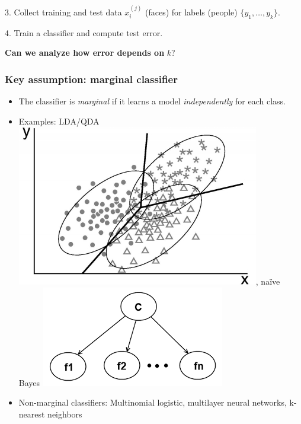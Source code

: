 \documentclass{beamer}
\begin{document}
\begin{frame}
\pause

\vspace{0.1in}
3. Collect training and test data $x_i^{(j)}$ (faces) for labels (people) $\{y_1,\hdots, y_k\}$.\pause

\vspace{0.1in}
4. Train a classifier and compute test error. \pause

\vspace{0.1in}
\textbf{Can we analyze how error depends on }$k$?
\end{frame}


\begin{frame}
\frametitle{Key assumption: marginal classifier}
\begin{itemize}
\item The classifier is \emph{marginal} if it learns a model \emph{independently} for each class.\pause
\item Examples: LDA/QDA \includegraphics[scale = 0.2]{discriminant.jpg}, \pause
na\"{i}ve Bayes \includegraphics[scale = 0.2]{naive_bayes.png}
\item Non-marginal classifiers: Multinomial logistic, multilayer neural networks, k-nearest neighbors
\end{itemize}
\end{frame}
\end{document}
